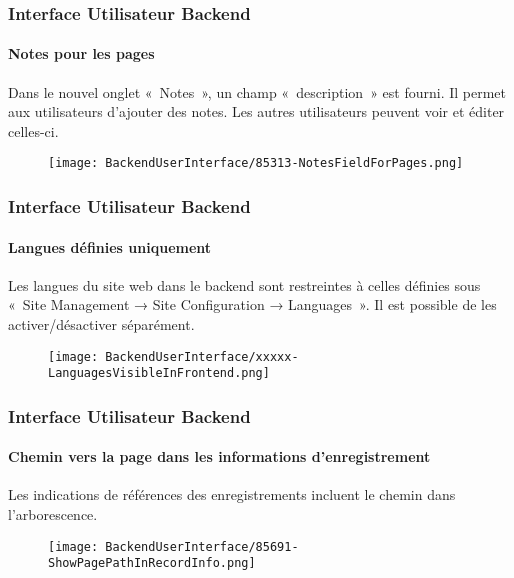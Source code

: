 
\begin{frame}[fragile]
	\frametitle{Interface Utilisateur Backend}
	\framesubtitle{Notes pour les pages}

	Dans le nouvel onglet «~Notes~», un champ «~description~» est fourni. Il
	permet aux utilisateurs d'ajouter des notes. Les autres utilisateurs
	peuvent voir et éditer celles-ci.

	\begin{figure}
		\texttt{[image: BackendUserInterface/85313-NotesFieldForPages.png]}
	\end{figure}

\end{frame}


\begin{frame}[fragile]
	\frametitle{Interface Utilisateur Backend}
	\framesubtitle{Langues définies uniquement}

	Les langues du site web dans le backend sont restreintes à celles définies
	sous «~Site Management → Site Configuration → Languages~». Il est possible
	de les activer/désactiver séparément.

	\begin{figure}
		\texttt{[image: BackendUserInterface/xxxxx-LanguagesVisibleInFrontend.png]}
	\end{figure}

\end{frame}


\begin{frame}[fragile]
	\frametitle{Interface Utilisateur Backend}
	\framesubtitle{Chemin vers la page dans les informations d'enregistrement}

	Les indications de références des enregistrements incluent le chemin dans l'arborescence.

	\begin{figure}
		\texttt{[image: BackendUserInterface/85691-ShowPagePathInRecordInfo.png]}
	\end{figure}

\end{frame}

